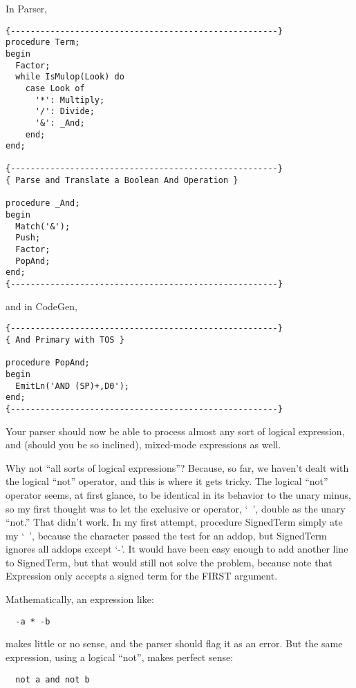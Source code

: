 In Parser,

\begin{verbatim}
{------------------------------------------------------}
procedure Term;
begin
  Factor;
  while IsMulop(Look) do
    case Look of
      '*': Multiply;
      '/': Divide;
      '&': _And;
    end;
end;

{------------------------------------------------------}
{ Parse and Translate a Boolean And Operation }

procedure _And;
begin
  Match('&');
  Push;
  Factor;
  PopAnd;
end;
{------------------------------------------------------}
\end{verbatim}

and in CodeGen,

\begin{verbatim}
{------------------------------------------------------}
{ And Primary with TOS }

procedure PopAnd;
begin
  EmitLn('AND (SP)+,D0');
end;
{------------------------------------------------------}
\end{verbatim}

Your parser should now be able to process almost any sort of logical expression, and (should you be so inclined), mixed-mode expressions as well.

Why not ``all sorts of logical expressions''?  Because, so far, we haven't dealt with the logical ``not'' operator, and this is where it gets tricky. The logical ``not'' operator seems, at first glance, to be identical in its behavior to the unary minus, so my first thought was to let the exclusive or operator, `~', double as the unary ``not.''  That didn't work. In my first attempt, procedure SignedTerm simply ate my `~', because the character passed the test for an addop, but SignedTerm ignores all addops except `-'. It would have been easy enough to add another line to SignedTerm, but that would still not solve the problem, because note that Expression only accepts a signed term for the  FIRST  argument.

Mathematically, an expression like:

\begin{verbatim}
  -a * -b
\end{verbatim}

makes little or no sense, and the parser should flag it as an error. But the same expression, using a logical ``not'', makes perfect sense:

\begin{verbatim}
  not a and not b
\end{verbatim}

